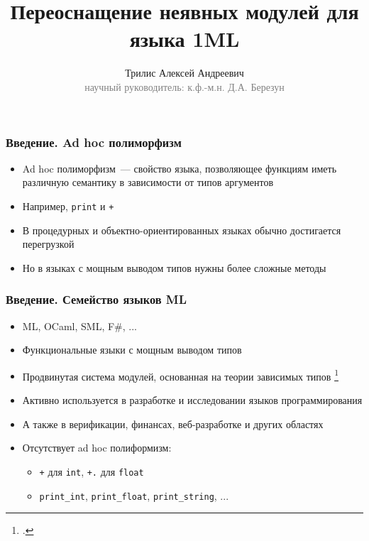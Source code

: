 \documentclass{beamer}
\begin{document}
\title[Неявные модули в 1ML]{Переоснащение неявных модулей для языка 1ML }
\author[Трилис А.А.]{Трилис Алексей Андреевич\\{\footnotesize\textcolor{gray}{научный руководитель: к.ф.-м.н. Д.А. Березун}}}
\frame{\titlepage}

\begin{frame}\frametitle{Введение. Ad hoc полиморфизм}
\begin{itemize}
  \item Ad hoc полиморфизм~--- свойство языка, позволяющее функциям иметь различную семантику в зависимости от типов аргументов
  \item Например, \texttt{print} и \texttt{+}
  \item В процедурных и объектно-ориентированных языках обычно достигается перегрузкой
  \item Но в языках с мощным выводом типов нужны более сложные методы
\end{itemize}
\end{frame}

\begin{frame}\frametitle{Введение. Семейство языков ML}
\begin{itemize}
  \item ML, OCaml, SML, F\#, ...
  \item Функциональные языки с мощным выводом типов
  \item Продвинутая система модулей, основанная на теории зависимых типов \footcite{dependent_types}
  \item Активно используется в разработке и исследовании языков программирования
  \item А также в верификации, финансах, веб-разработке и других областях
  \item Отсутствует ad hoc полиформизм:
  \begin{itemize}
    \item \texttt{+} для \texttt{int}, \texttt{+.} для \texttt{float}
    \item \texttt{print\_int}, \texttt{print\_float}, \texttt{print\_string}, ...
  \end{itemize}
\end{itemize}
\end{frame}
\end{document}
